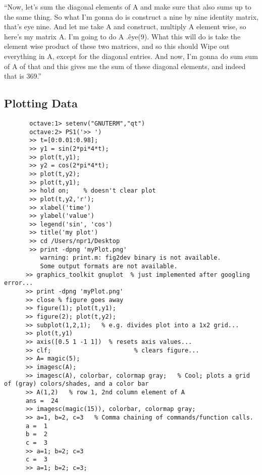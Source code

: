 \documentclass[11pt,a4paper]{article}
\begin{document}
   ``Now, let's sum the diagonal elements of A and make sure that also sums
   up to the same thing.  So what I'm gonna do is construct a nine by
   nine identity matrix, that's eye nine. And let me take A and
   construct, multiply A element wise, so here's my matrix A. I'm going
   to do A .\^ eye(9). What this will do is take the element wise product
   of these two matrices, and so this should Wipe out everything in A,
   except for the diagonal entries. And now, I'm gonna do sum sum of A of
   that and this gives me the sum of these diagonal elements, and indeed
   that is 369.''
   
    \subsection{Plotting Data}
     \begin{lstlisting}
       octave:1> setenv("GNUTERM","qt")
       octave:2> PS1('>> ')
       >> t=[0:0.01:0.98];
       >> y1 = sin(2*pi*4*t);
       >> plot(t,y1);
       >> y2 = cos(2*pi*4*t);
       >> plot(t,y2);
       >> plot(t,y1);
       >> hold on;    % doesn't clear plot
       >> plot(t,y2,'r');
       >> xlabel('time')
       >> ylabel('value')
       >> legend('sin', 'cos')
       >> title('my plot')
       >> cd /Users/npr1/Desktop
       >> print -dpng 'myPlot.png'
          warning: print.m: fig2dev binary is not available.
          Some output formats are not available.
      >> graphics_toolkit gnuplot  % just implemented after googling error...
      >> print -dpng 'myPlot.png'
      >> close % figure goes away
      >> figure(1); plot(t,y1);
      >> figure(2); plot(t,y2);
      >> subplot(1,2,1);   % e.g. divides plot into a 1x2 grid...
      >> plot(t,y1)
      >> axis([0.5 1 -1 1])  % resets axis values...
      >> clf;                       % clears figure...
      >> A= magic(5);
      >> imagesc(A);
      >> imagesc(A), colorbar, colormap gray;   % Cool; plots a grid of (gray) colors/shades, and a color bar
      >> A(1,2)   % row 1, 2nd column element of A 
      ans =  24
      >> imagesc(magic(15)), colorbar, colormap gray; 
      >> a=1, b=2, c=3   % Comma chaining of commands/function calls.
      a =  1
      b =  2
      c =  3
      >> a=1; b=2; c=3
      c =  3
      >> a=1; b=2; c=3;
    \end{lstlisting}
 
\end{document}
